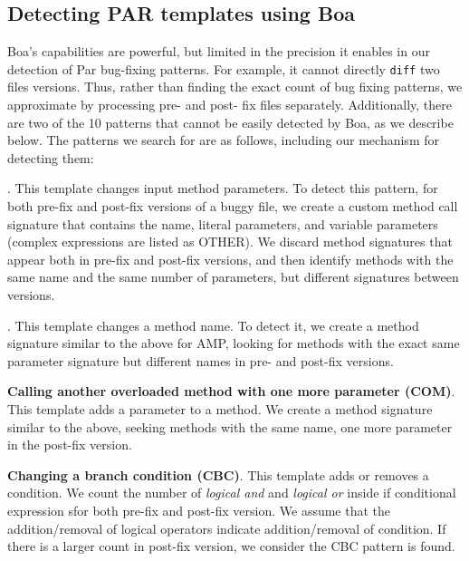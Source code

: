 \documentclass{sig-alternate-05-2015}
\begin{document}
\subsection{Detecting PAR templates using Boa}

Boa's capabilities are powerful, but limited in the precision it enables in
our detection of Par bug-fixing patterns. For example, it cannot directly \texttt{diff}
two files versions. Thus, rather than finding the exact count of
bug fixing patterns, we approximate by processing pre- and
post- fix files separately.  Additionally, there are
two of the 10 patterns that cannot be easily detected by
Boa, as we describe below. 
%
The patterns we search for are as follows, including our mechanism for
detecting them:

\vspace{1ex}
.  This template changes 
input method parameters. %
To detect this pattern, for both pre-fix and post-fix versions
of a buggy file, we create a custom method call signature that
contains the name, literal parameters, and variable parameters (complex
expressions are listed as OTHER).
We discard method signatures that appear both in pre-fix and post-fix
versions, and then identify methods with the same name and the
same number of parameters, but different signatures between versions. 

\vspace{1ex}
.  This
template changes a method name. %
To detect it, we create a method signature similar
to the above for AMP, looking for methods
with the exact same parameter signature but different names in pre- and
post-fix versions. %

\vspace{1ex}
\noindent
{\bf Calling another overloaded method with one more parameter (COM)}. This
template adds a parameter to a method. %
We create a method signature similar to the above, seeking methods with
  the same name, one more parameter in the post-fix version. 

\vspace{1ex}
\noindent
 {\bf Changing a branch condition (CBC)}. This template adds or removes a condition.
We count the number of { \em logical and} and {\em
    logical or} inside if conditional expression sfor both pre-fix and post-fix
  version. We assume that the addition/removal of logical operators indicate
  addition/removal of condition. If there is a larger count in post-fix version,
  we consider the CBC pattern is found. 
\end{document}
